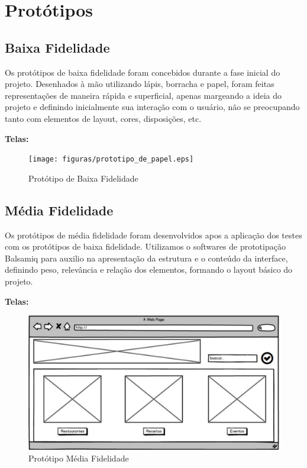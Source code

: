 \chapter[Protótipos]{Protótipos}

\section{Baixa Fidelidade}

Os protótipos de baixa fidelidade foram concebidos durante a fase inicial do projeto. Desenhados à mão utilizando lápis, borracha e papel, foram feitas representações de maneira rápida e superficial, apenas margeando a ideia do projeto e definindo inicialmente sua interação com o usuário, não se preocupando tanto com elementos de layout, cores, disposições, etc.

\textbf{Telas:}

\begin{figure}[H]
	\begin{center}
		\texttt{[image: figuras/prototipo\_de\_papel.eps]}
		\caption{Protótipo de Baixa Fidelidade}
	\end{center}
\end{figure}

\section{Média Fidelidade}

Os protótipos de média fidelidade foram desenvolvidos apos a aplicação dos testes com os protótipos de baixa fidelidade. Utilizamos o softwares de prototipação Balsamiq para auxilio na apresentação da estrutura e o conteúdo da interface, definindo peso, relevância e relação dos elementos, formando o layout básico do projeto.

\textbf{Telas:}

\begin{figure}[H]
	\begin{center}
		\includegraphics[keepaspectratio,scale=0.3]{figuras/media_fidelidade/prototipo1.eps}
		\caption{Protótipo Média Fidelidade}
	\end{center}
\end{figure}

